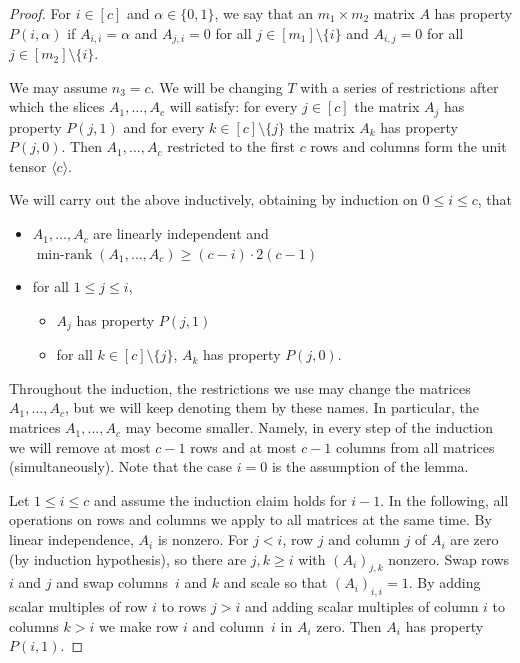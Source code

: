 \documentclass{daj}
\DeclareMathOperator{\minrank}{min-rank}
\begin{document}
\begin{proof}
%
For $i \in [c]$ and $\alpha \in \{0,1\}$, we say that an $m_1\times m_2$ matrix $A$ has property $P(i,\alpha)$ if $A_{i,i} = \alpha$ and $A_{j, i} = 0$ for all $j \in [m_1]\setminus \{i\}$ and $A_{i,j} = 0$ for all $j \in [m_2] \setminus \{i\}$.

We may assume $n_3 = c$.
We will be changing $T$ with a series of restrictions after which the slices $A_1, \ldots, A_c$ will satisfy: for every $j \in [c]$ the matrix $A_j$ has property $P(j, 1)$ and for every $k \in [c] \setminus \{j\}$ the matrix $A_k$ has property $P(j, 0)$. Then $A_1, \ldots, A_c$ restricted to the first $c$ rows and columns form the unit tensor $\langle c\rangle$.

We will carry out the above inductively, obtaining by induction on $0 \leq i \leq c$, that 
\begin{itemize}
\item $A_1, \ldots, A_c$ are linearly independent and $\minrank(A_1, \ldots, A_c) \geq (c-i)\cdot 2(c-1)$
\item for all $1 \leq j \leq i$, 
\begin{itemize}
    \item $A_j$ has property $P(j, 1)$
    \item for all $k \in [c] \setminus \{j\}$, $A_k$ has property $P(j, 0)$.
\end{itemize}  
\end{itemize}
Throughout the induction, the restrictions we use may change the matrices $A_1, \ldots, A_c$, but we will keep denoting them by these names. In particular, the matrices $A_1, \ldots, A_c$ may become smaller. Namely, in every step of the induction we will remove at most $c-1$ rows and at most $c-1$ columns from all matrices (simultaneously). Note that the case $i=0$ is the assumption of the lemma.

Let $1 \leq i\leq c$ and assume the induction claim holds for $i-1$. 
In the following, all operations on rows and columns we apply to all matrices at the same time.
By linear independence, $A_i$ is nonzero. For $j < i$, row $j$ and column $j$ of $A_i$ are zero (by induction hypothesis), so there are $j,k \geq i$ with $(A_i)_{j,k}$ nonzero.
Swap rows $i$ and $j$ and swap columns~$i$ and $k$ and scale so that $(A_i)_{i,i} = 1$. By adding scalar multiples of row $i$ to rows $j > i$ and adding scalar multiples of column $i$ to columns $k > i$ we make row $i$ and column~$i$ in $A_i$ zero. Then $A_i$ has property $P(i,1)$. 


\end{proof}
\end{document}
